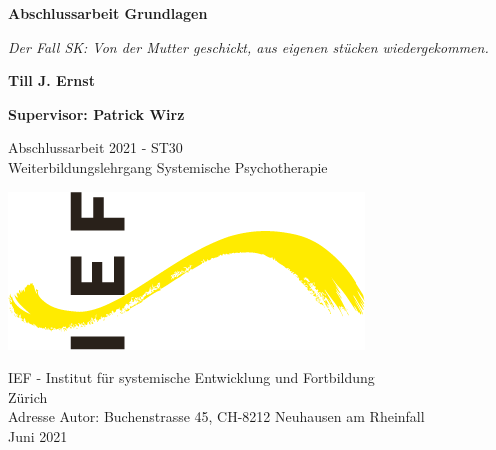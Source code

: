 \begin{titlepage}
    \begin{center}
        \vspace*{1cm}
            
        \Huge
        \textbf{Abschlussarbeit Grundlagen}
            
        \vspace{0.5cm}
        \LARGE
        \textit{Der Fall SK: Von der Mutter geschickt, aus eigenen stücken wiedergekommen.}
            
        \vspace{1.5cm}
            
        \textbf{Till J. Ernst}
        \vspace{1.5cm}
            
        \textbf{Supervisor: Patrick Wirz}
            
        \vfill
            
        Abschlussarbeit 2021 - ST30\\
        Weiterbildungslehrgang Systemische Psychotherapie
            
        \vspace{1cm}
            
        \includegraphics{pictures/ieflogo}
            
            
        \Large
        IEF - Institut für systemische Entwicklung und Fortbildung\\
        Zürich\\
        
        \vspace{1.5cm}
        Adresse Autor: Buchenstrasse 45, CH-8212 Neuhausen am Rheinfall\\
        Juni 2021
            
    \end{center}
\end{titlepage}